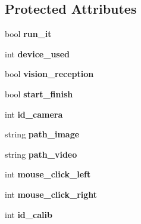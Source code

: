 \subsection*{Protected Attributes}
\begin{DoxyCompactItemize}
\item 
\hypertarget{classcalibration_a3b4703e9670b0c80359bae2747878245}{bool {\bfseries run\-\_\-it}}\label{classcalibration_a3b4703e9670b0c80359bae2747878245}

\item 
\hypertarget{classcalibration_a5f6ca76dc8c0fbf33f1c6a604b72cdc0}{int {\bfseries device\-\_\-used}}\label{classcalibration_a5f6ca76dc8c0fbf33f1c6a604b72cdc0}

\item 
\hypertarget{classcalibration_a9606829157d28f46f87febceb67ba14c}{bool {\bfseries vision\-\_\-reception}}\label{classcalibration_a9606829157d28f46f87febceb67ba14c}

\item 
\hypertarget{classcalibration_aa3b093eb7694fdcb78408efdeb331e01}{bool {\bfseries start\-\_\-finish}}\label{classcalibration_aa3b093eb7694fdcb78408efdeb331e01}

\item 
\hypertarget{classcalibration_abb71e83b1caac73be1f8a5ec9ff85f5f}{int {\bfseries id\-\_\-camera}}\label{classcalibration_abb71e83b1caac73be1f8a5ec9ff85f5f}

\item 
\hypertarget{classcalibration_ab5b38c34686e2d0ef790f5ea1bf022d2}{string {\bfseries path\-\_\-image}}\label{classcalibration_ab5b38c34686e2d0ef790f5ea1bf022d2}

\item 
\hypertarget{classcalibration_ac3b22d58acc42fb7c8217518f6ea4846}{string {\bfseries path\-\_\-video}}\label{classcalibration_ac3b22d58acc42fb7c8217518f6ea4846}

\item 
\hypertarget{classcalibration_ada27036ba780db458e9dc14f13f0809a}{int {\bfseries mouse\-\_\-click\-\_\-left}}\label{classcalibration_ada27036ba780db458e9dc14f13f0809a}

\item 
\hypertarget{classcalibration_a40702565952927ef98184ddeb27d5581}{int {\bfseries mouse\-\_\-click\-\_\-right}}\label{classcalibration_a40702565952927ef98184ddeb27d5581}

\item 
\hypertarget{classcalibration_a574fce12317e7968bd7553fbf715ab64}{int {\bfseries id\-\_\-calib}}\label{classcalibration_a574fce12317e7968bd7553fbf715ab64}


\end{DoxyCompactItemize}
